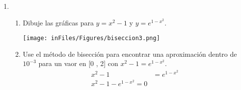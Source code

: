\documentclass[12pt]{article}
\begin{document}
\begin{enumerate}
    \item \begin{enumerate}[label=\alph*]
        \item Dibuje las gráficas para \( y = x^{2} - 1\) y \( y = e^{1-x^{2}}\). 
        
        \begin{center}
            \texttt{[image: inFiles/Figures/biseccion3.png]}     
        \end{center}
        \item Use el método de bisección para encontrar una aproximación dentro de \(10^{-3}\) para un vaor en [0 , 2] con \(x^{2} - 1 = e^{1-x^{2}}\). 
        \[
        \begin{aligned}
            x^{2} - 1 &= e^{1-x^{2}}\\
            x^{2} - 1 - e^{1-x^{2}} = 0
        \end{aligned}
        \]


\end{enumerate}
\end{enumerate}
\end{document}
